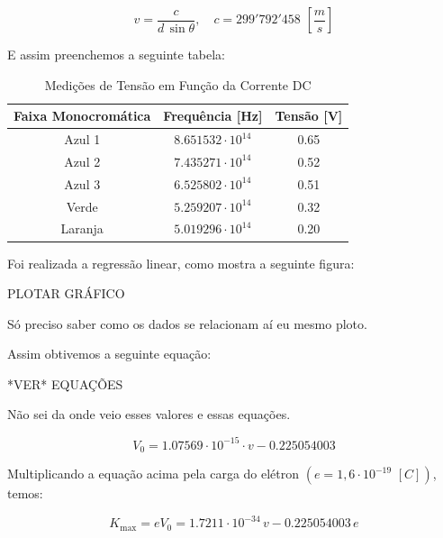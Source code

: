 \documentclass[10pt,twocolumn,letterpaper]{article}
\begin{document}
\vspace{-.25cm}

\begin{equation*}
    v = \frac{c}{d\,\sin{\theta}}, \quad c = 299'792'458 \,\, \left[\frac{m}{s}\right]
\end{equation*}

\noindent E assim preenchemos a seguinte tabela:

\begin{table}[htbp]
    \centering
    \caption{Medições de Tensão em Função da Corrente DC}
    \label{tab:medicoes_tensao}
    \vspace{0.25cm}
    \begin{tabular}{ccc}
        \hline
        \rule{0pt}{3ex}\textbf{Faixa Monocromática} & \textbf{Frequência} [Hz] & \textbf{Tensão} [V]\\[5pt]
        \hline
        \rule{0pt}{3ex}Azul 1 & $8.651532\cdot 10^{14}$ & 0.65 \\
        Azul 2 & $7.435271\cdot 10^{14}$ & 0.52 \\
        Azul 3 & $6.525802\cdot 10^{14}$ & 0.51 \\
        Verde & $5.259207\cdot 10^{14}$ & 0.32 \\
        Laranja & $5.019296\cdot 10^{14}$ & 0.20 \\[5pt]
        \hline
    \end{tabular}
\end{table}

\hspace{1cm}  Foi realizada a regressão linear, como mostra a seguinte figura:

{\Huge \color{red} PLOTAR GRÁFICO}

{\color{red} Só preciso saber como os dados se relacionam aí eu mesmo ploto.}

\noindent Assim obtivemos a seguinte equação:

{\Huge \color{red} *VER* EQUAÇÕES}

{\color{red} Não sei da onde veio esses valores e essas equações.}

\begin{equation*}
    V_0 = 1.07569 \cdot 10^{-15} \cdot v - 0.225054003
\end{equation*}

\hspace{1cm} Multiplicando a equação acima pela carga do elétron $(e =
1, 6 \cdot 10^{-19} \,\, [C])$, temos:

\begin{equation*}
    K_{\max} = eV_0 = 1.7211 \cdot 10^{-34}\,v - 0.225054003\,e
\end{equation*}
\end{document}
